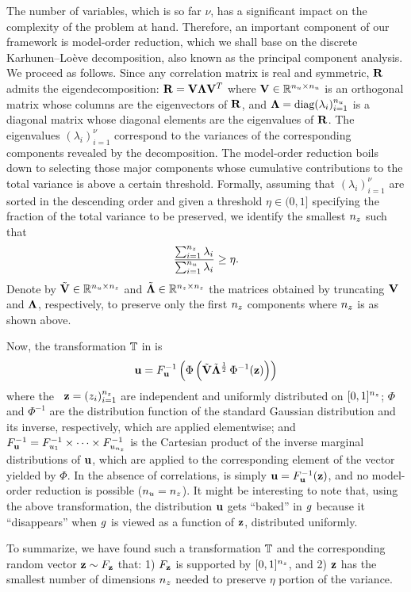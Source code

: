 The number of variables, which is so far $\nu$, has a significant impact on the
complexity of the problem at hand. Therefore, an important component of our
framework is model-order reduction, which we shall base on the discrete
Karhunen--Lo\`{e}ve decomposition, also known as the principal component
analysis. We proceed as follows. Since any correlation matrix is real and
symmetric, $\mathbf{R}$ admits the eigendecomposition: $\mathbf{R} = \mathbf{V}
\mathbf{\Lambda} \mathbf{V}^T$ where $\mathbf{V} \in \mathbb{R}^{{n_u} \times {n_u}}$ is an orthogonal
matrix whose columns are the eigenvectors of $\mathbf{R}$, and $\mathbf{\Lambda} =
\text{diag}(\lambda_i)_{i = 1}^{n_u}$ is a diagonal matrix whose diagonal elements are
the eigenvalues of $\mathbf{R}$. The eigenvalues $(\lambda_i)_{i = 1}^\nu$
correspond to the variances of the corresponding components revealed by the
decomposition. The model-order reduction boils down to selecting those major
components whose cumulative contributions to the total variance is above a
certain threshold. Formally, assuming that $(\lambda_i)_{i = 1}^\nu$ are sorted
in the descending order and given a threshold $\eta \in (0, 1]$ specifying the
fraction of the total variance to be preserved, we identify the smallest ${n_z}$
such that
\begin{equation} \elab{reduction}
  \frac{\sum_{i = 1}^\nz \lambda_i}{\sum_{i = 1}^\nu \lambda_i} \geq \eta.
\end{equation}
Denote by $\tilde{\mathbf{V}} \in \mathbb{R}^{{n_u} \times {n_z}}$ and $\tilde{\mathbf{\Lambda}}
\in\mathbb{R}^{{n_z} \times {n_z}}$ the matrices obtained by truncating $\mathbf{V}$ and
$\mathbf{\Lambda}$, respectively, to preserve only the first ${n_z}$ components where
${n_z}$ is as shown above.

Now, the transformation $\mathbb{T}$ in  is
\begin{equation} \elab{transformation-concrete}
  \vu = \distribution_\vu^{-1} \left( \Phi\left( \tilde{\m{V}} \tilde{\m{\Lambda}}^\frac{1}{2} \, \Phi^{-1}(\vz) \right) \right)
\end{equation}
where the \rvs\ $\mathbf{z} = (z_i)_{i = 1}^{n_z}$ are independent and uniformly
distributed on $[0, 1]^{n_z}$; $\Phi$ and $\Phi^{-1}$ are the distribution
function of the standard Gaussian distribution and its inverse, respectively,
which are applied elementwise; and $F_{\mathbf{u}}^{-1} =
F_{u_1}^{-1} \times \cdots \times F_{u_{n_z}}^{-1}$ is
the Cartesian product of the inverse marginal distributions of $\mathbf{u}$, which are
applied to the corresponding element of the vector yielded by $\Phi$. In the
absence of correlations,  is simply $\mathbf{u} =
F_{\mathbf{u}}^{-1}(\mathbf{z})$, and no model-order reduction is possible (${n_u} =
{n_z}$). It might be interesting to note that, using the above transformation, the
distribution $\mathbf{u}$ gets ``baked'' in $g$ because it ``disappears'' when $g$ is
viewed as a function of $\mathbf{z}$, distributed uniformly.

To summarize, we have found such a transformation $\mathbb{T}$ and the
corresponding random vector $\mathbf{z} \sim F_{\mathbf{z}}$ that: 1)
$F_{\mathbf{z}}$ is supported by $[0, 1]^{n_z}$, and 2) $\mathbf{z}$ has the smallest
number of dimensions ${n_z}$ needed to preserve $\eta$ portion of the variance.
